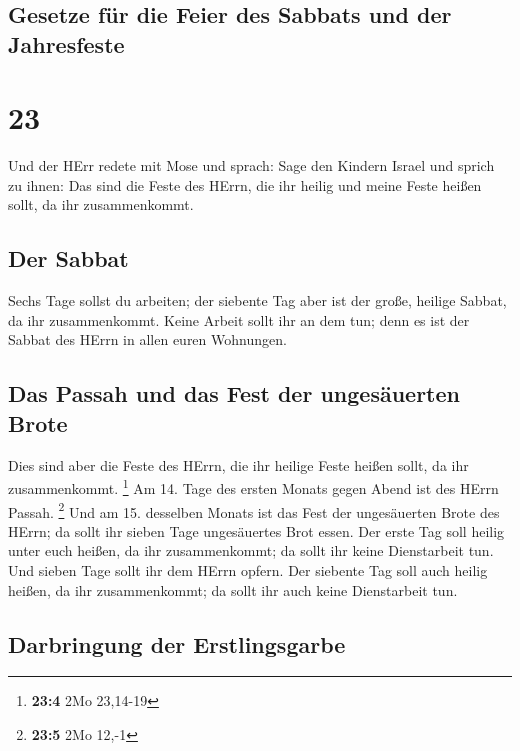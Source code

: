 \hypertarget{gesetze-fuxfcr-die-feier-des-sabbats-und-der-jahresfeste}{%
\subsection{Gesetze für die Feier des Sabbats und der
Jahresfeste}\label{gesetze-fuxfcr-die-feier-des-sabbats-und-der-jahresfeste}}

\hypertarget{section-22}{%
\section{23}\label{section-22}}

 Und der HErr redete mit Mose und sprach: 
Sage den Kindern Israel und sprich zu ihnen: Das sind die Feste des
HErrn, die ihr heilig und meine Feste heißen sollt, da ihr
zusammenkommt.

\hypertarget{der-sabbat}{%
\subsection{Der Sabbat}\label{der-sabbat}}

 Sechs Tage sollst du arbeiten; der siebente Tag aber ist
der große, heilige Sabbat, da ihr zusammenkommt. Keine Arbeit sollt ihr
an dem tun; denn es ist der Sabbat des HErrn in allen euren Wohnungen.

\hypertarget{das-passah-und-das-fest-der-ungesuxe4uerten-brote}{%
\subsection{Das Passah und das Fest der ungesäuerten
Brote}\label{das-passah-und-das-fest-der-ungesuxe4uerten-brote}}

 Dies sind aber die Feste des HErrn, die ihr heilige Feste
heißen sollt, da ihr zusammenkommt. \footnote{\textbf{23:4} 2Mo 23,14-19}
 Am 14. Tage des ersten Monats gegen Abend ist des HErrn
Passah. \footnote{\textbf{23:5} 2Mo 12,-1}  Und am 15.
desselben Monats ist das Fest der ungesäuerten Brote des HErrn; da sollt
ihr sieben Tage ungesäuertes Brot essen.  Der erste Tag
soll heilig unter euch heißen, da ihr zusammenkommt; da sollt ihr keine
Dienstarbeit tun.  Und sieben Tage sollt ihr dem HErrn
opfern. Der siebente Tag soll auch heilig heißen, da ihr zusammenkommt;
da sollt ihr auch keine Dienstarbeit tun.

\hypertarget{darbringung-der-erstlingsgarbe}{%
\subsection{Darbringung der
Erstlingsgarbe}\label{darbringung-der-erstlingsgarbe}}

